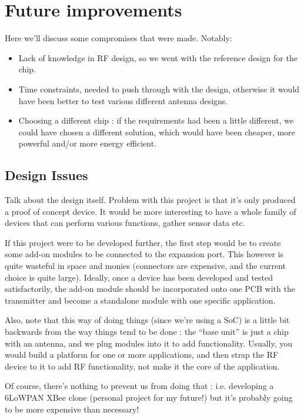 \chapter{Future improvements}\label{ch:improvements}

Here we'll discuss some compromises that were made. Notably:

\begin{itemize}
  \item Lack of knowledge in RF design, so we went with the reference design for
    the chip.
  \item Time constraints, needed to push through with the design, otherwise it
    would have been better to test various different antenna designs. 
  \item Choosing a different chip : if the requirements had been a little
    different, we could have chosen a different solution, which would have been
    cheaper, more powerful and/or more energy efficient.
\end{itemize}

\section{Design Issues}

Talk about the design itself. Problem with this project is that it's only
produced a proof of concept device. It would be more interesting to have a whole
family of devices that can perform various functions, gather sensor data etc.

If this project were to be developed further, the first step would be to create
some add-on modules to be connected to the expansion port. This however is quite
wasteful in space and monies (connectors are expensive, and the current choice
is quite large). Ideally, once a device has been developed and tested
satisfactorily, the add-on module should be incorporated onto one PCB with the
transmitter and become a standalone module with one specific application.

Also, note that this way of doing things (since we're using a SoC) is a little
bit backwards from the way things tend to be done : the ``base unit'' is just
a chip with an antenna, and we plug modules into it to add functionality.
Usually, you would build a platform for one or more applications, and then strap
the RF device to it to add RF functionality, not make it the core of the
application.

Of course, there's nothing to prevent us from doing that : i.e. developing
a 6LoWPAN XBee clone (personal project for my future!) but it's probably going
to be more expensive than necessary!
